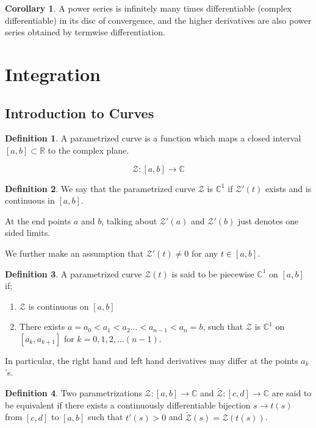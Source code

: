 \documentclass[12pt]{article}
\newcommand{\R}{\mathbb{R}}
\newcommand{\C}{\mathbb{C}}
\newcommand{\zcal}{\mathcal{Z}}
\let\oldsection\section
\renewcommand\section{\clearpage\oldsection}
\theoremstyle{definition}
\newtheorem{cor}{Corollary}
\newtheorem{defn}{Definition}
\newenvironment{definition}{
\begin{tcolorbox}[colback=green!5!white,colframe=green!75!black, parbox = false]\begin{defn} }{\end{defn}\end{tcolorbox} }
\newenvironment{note}{
\begin{tcolorbox}[colback=blue!5!white,colframe=blue!75!black,title=Note, parbox = false] }{\end{tcolorbox} }
\newenvironment{corollary}{
\begin{tcolorbox}[colback=blue!5!white,colframe=blue!75!black, parbox = false]\begin{cor} }{\end{cor}\end{tcolorbox} }
\begin{document}
\begin{corollary}
    A power series is infinitely many times differentiable (complex differentiable) in its disc of convergence, and the higher derivatives are also power series obtained by termwise differentiation.
\end{corollary}


\section{Integration}

\subsection{Introduction to Curves}

\begin{definition}
    A parametrized curve is a function which maps a closed interval $[a, b] \subset \R$ to the complex plane.

    $$\zcal : [a, b] \rightarrow \C$$
\end{definition}

\begin{definition}
    We say that the parametrized curve $\zcal$ is $\C^1$ if $\zcal'(t)$ exists and is continuous in $[a, b]$.

    \begin{note}
        At the end points $a$ and $b$, talking about $\zcal'(a)$ and $\zcal'(b)$ just denotes one sided limits. 
    \end{note}
\end{definition}

We further make an assumption that $\zcal'(t) \neq 0$ for any $t \in [a, b]$.

\begin{definition}
    A parametrized curve $\zcal(t)$ is said to be piecewise $\C^1$ on $[a, b]$ if;
    \begin{enumerate}
        \item $\zcal$ is continuous on $[a, b]$
        \item There exists $a = a_0 < a_1 < a_2 \dots < a_{n-1} < a_n = b$, such that $\zcal$ is $\C^1$ on $[a_k, a_{k+1}]$ for $k = 0, 1, 2, \dots (n-1)$.
    \end{enumerate}

    In particular, the right hand and left hand derivatives may differ at the points $a_k$'s.
\end{definition}

\begin{definition}
    Two parametrizations $\zcal : [a, b] \rightarrow \C$ and $\widetilde{\zcal} : [c, d] \rightarrow \C$ are said to be equivalent if there exists a continuously differentiable bijection $s \rightarrow t(s)$ from $[c, d]$ to $[a, b]$ such that $t'(s) > 0$ and $\widetilde{\zcal}(s) = {\zcal}(t(s))$.
\end{definition}
\end{document}
